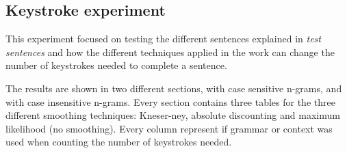 \subsection{Keystroke experiment}
This experiment focused on testing the different sentences explained in \emph{test sentences} and how the different techniques applied in the work can change the number of keystrokes needed to complete a sentence.

The results are shown in two different sections, with case sensitive n-grams, and with case insensitive n-grams. Every section contains three tables for the three different smoothing techniques: Kneser-ney, absolute discounting and maximum likelihood (no smoothing). Every column represent if grammar or context was used when counting the number of keystrokes needed.

